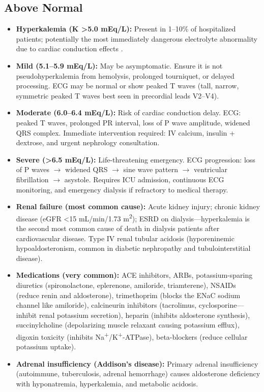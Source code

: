 \subsection*{Above Normal}
\begin{itemize}
  \item \textbf{Hyperkalemia (K >5.0 mEq/L):} Present in 1--10\% of hospitalized patients; potentially the most immediately dangerous electrolyte abnormality due to cardiac conduction effects \cite{montford2017dangerous}.
  \item \textbf{Mild (5.1--5.9 mEq/L):} May be asymptomatic. Ensure it is not pseudohyperkalemia from hemolysis, prolonged tourniquet, or delayed processing. ECG may be normal or show peaked T waves (tall, narrow, symmetric peaked T waves best seen in precordial leads V2--V4).
  \item \textbf{Moderate (6.0--6.4 mEq/L):} Risk of cardiac conduction delay. ECG: peaked T waves, prolonged PR interval, loss of P wave amplitude, widened QRS complex. Immediate intervention required: IV calcium, insulin + dextrose, and urgent nephrology consultation.
  \item \textbf{Severe (>6.5 mEq/L):} Life-threatening emergency. ECG progression: loss of P waves $\rightarrow$ widened QRS $\rightarrow$ sine wave pattern $\rightarrow$ ventricular fibrillation $\rightarrow$ asystole. Requires ICU admission, continuous ECG monitoring, and emergency dialysis if refractory to medical therapy.
  \item \textbf{Renal failure (most common cause):} Acute kidney injury; chronic kidney disease (eGFR <15 mL/min/1.73 m\textsuperscript{2}); ESRD on dialysis---hyperkalemia is the second most common cause of death in dialysis patients after cardiovascular disease. Type IV renal tubular acidosis (hyporeninemic hypoaldosteronism, common in diabetic nephropathy and tubulointerstitial disease).
  \item \textbf{Medications (very common):} ACE inhibitors, ARBs, potassium-sparing diuretics (spironolactone, eplerenone, amiloride, triamterene), NSAIDs (reduce renin and aldosterone), trimethoprim (blocks the ENaC sodium channel like amiloride), calcineurin inhibitors (tacrolimus, cyclosporine---inhibit renal potassium secretion), heparin (inhibits aldosterone synthesis), succinylcholine (depolarizing muscle relaxant causing potassium efflux), digoxin toxicity (inhibits Na\textsuperscript{+}/K\textsuperscript{+}-ATPase), beta-blockers (reduce cellular potassium uptake).
  \item \textbf{Adrenal insufficiency (Addison's disease):} Primary adrenal insufficiency (autoimmune, tuberculosis, adrenal hemorrhage) causes aldosterone deficiency with hyponatremia, hyperkalemia, and metabolic acidosis.

\end{itemize}
